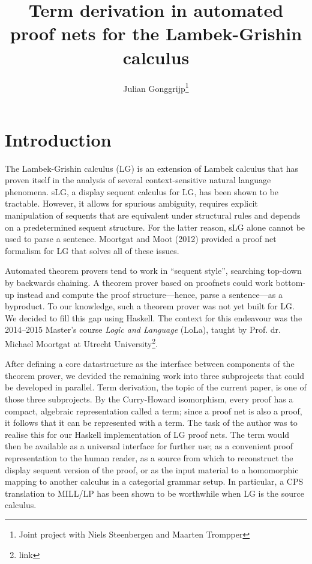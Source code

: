 \documentclass[12pt,a4paper]{article}
\begin{document}
\title{Term derivation in automated proof nets for the Lambek-Grishin calculus}
\author{Julian Gonggrijp\thanks{Joint project with Niels Steenbergen and Maarten Trompper}}
\date{}
\maketitle


\section{Introduction}

The Lambek-Grishin calculus (LG) is an extension of Lambek calculus that has proven itself in the analysis of several context-sensitive natural language phenomena. sLG, a display sequent calculus for LG, has been shown to be tractable. \cite{m09} However, it allows for spurious ambiguity, requires explicit manipulation of sequents that are equivalent under structural rules and depends on a predetermined sequent structure. For the latter reason, sLG alone cannot be used to parse a sentence. Moortgat and Moot (2012) provided a proof net formalism for LG that solves all of these issues. \cite{mm12}

Automated theorem provers tend to work in ``sequent style'', searching top-down by backwards chaining. A theorem prover based on proofnets could work bottom-up instead and compute the proof structure---hence, parse a sentence---as a byproduct. To our knowledge, such a theorem prover was not yet built for LG. We decided to fill this gap using Haskell. The context for this endeavour was the 2014--2015 Master's course \emph{Logic and Language} (LoLa), taught by Prof. dr. Michael Moortgat at Utrecht University\footnote{link}.

After defining a core datastructure as the interface between components of the theorem prover, we devided the remaining work into three subprojects that could be developed in parallel. Term derivation, the topic of the current paper, is one of those three subprojects. By the Curry-Howard isomorphism, every proof has a compact, algebraic representation called a term; since a proof net is also a proof, it follows that it can be represented with a term. The task of the author was to realise this for our Haskell implementation of LG proof nets. The term would then be available as a universal interface for further use; as a convenient proof representation to the human reader, as a source from which to reconstruct the display sequent version of the proof, or as the input material to a homomorphic mapping to another calculus in a categorial grammar setup. In particular, a CPS translation to MILL/LP has been shown to be worthwhile when LG is the source calculus. \cite{mm12}
\end{document}
